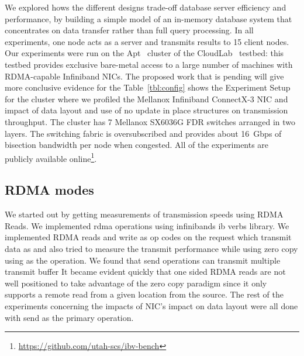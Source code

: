 We explored hows the different designs trade-off database server efficiency and
performance, by building a simple model of an in-memory database system that
concentrates on data transfer rather than full query processing. In all experiments,
one node acts as a server and transmits results to 15 client nodes.
Our experiments were run on the Apt~\cite{Ricci+:OSR15} cluster of the
CloudLab~\cite{Cloudlab:URL} testbed: this testbed provides exclusive bare-metal
access to a large number of machines with RDMA-capable Infiniband NICs.
The proposed work that is pending will give more conclusive evidence for the 
Table~\ref{tbl:config} shows the Experiment Setup for the cluster where we profiled
the Mellanox Infiniband ConnectX-3 \textregistered NIC and impact of data layout and 
use of no update in place structures on transmission throughput. The cluster has 7
Mellanox SX6036G FDR switches arranged in two layers. The switching fabric is
oversubscribed and provides about 16~Gbps of bisection bandwidth per node
when congested. All of the experiments are
publicly available online\footnote{\url{https://github.com/utah-scs/ibv-bench}}.







\subsection{RDMA modes}
We started out by getting measurements of transmission speeds using RDMA Reads.
We implemented rdma operations using infinibands ib verbs library. We implemented 
RDMA reads and write as op codes on the  request which 
transmit data as  and also tried to measure the transmit
performance while using zero copy using  as the operation.
We found that send operations can transmit multiple transmit buffer
It became evident quickly that one sided RDMA reads are not well positioned to 
take advantage of the zero copy paradigm since it only supports a remote read 
from a given location from the source. The rest of the experiments concerning
the impacts of NIC's impact on data layout were all done with send as the primary
operation. 


